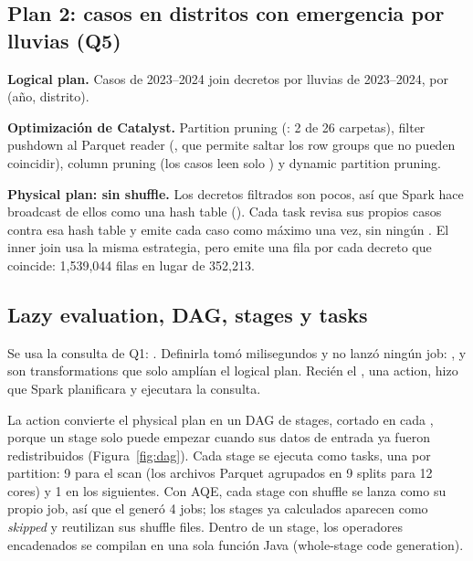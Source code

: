 \subsection{Plan 2: casos en distritos con emergencia por lluvias (Q5)}

\textbf{Logical plan.} Casos de 2023–2024  join decretos por lluvias de 2023–2024, por
(año, distrito).

\textbf{Optimización de Catalyst.} Partition pruning (: 2 de 26 carpetas), filter
pushdown al Parquet reader (, que permite saltar los row groups que no
pueden coincidir), column pruning (los casos leen solo ) y dynamic partition pruning.

\textbf{Physical plan: sin shuffle.} Los decretos filtrados son pocos, así que Spark hace broadcast de ellos como
una hash table (). Cada task revisa sus propios casos contra esa
hash table y emite cada caso como máximo una vez, sin ningún . El inner join usa la misma
estrategia, pero emite una fila por cada decreto que coincide: 1,539,044 filas en lugar de 352,213.

\subsection{Lazy evaluation, DAG, stages y tasks}

Se usa la consulta de Q1: . Definirla tomó milisegundos y
no lanzó ningún job: ,  y  son transformations que solo amplían el logical
plan. Recién el , una action, hizo que Spark planificara y ejecutara la consulta.

La action convierte el physical plan en un DAG de stages, cortado en cada , porque un stage solo
puede empezar cuando sus datos de entrada ya fueron redistribuidos (Figura~\ref{fig:dag}). Cada stage se ejecuta
como tasks, una por partition: 9 para el scan (los archivos Parquet agrupados en 9 splits para 12 cores) y 1 en
los siguientes. Con AQE, cada stage con shuffle se lanza como su propio job, así que el  generó 4
jobs; los stages ya calculados aparecen como \emph{skipped} y reutilizan sus shuffle files. Dentro de un stage,
los operadores encadenados se compilan en una sola función Java (whole-stage code generation).

